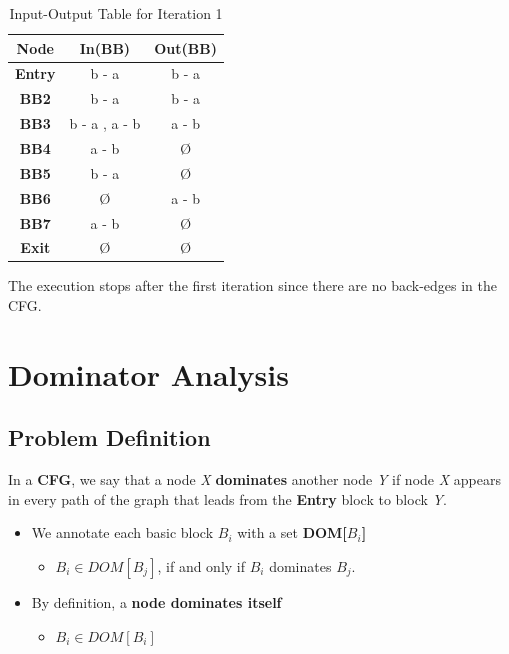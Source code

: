 \documentclass[a4paper,12pt,numbers=noenddot]{scrreprt}
\begin{document}
        \begin{table}[H]
            \centering
            \begin{tabular}{|c|c|c|}
                \hline
                \textbf{Node} & \textbf{In(BB)} & \textbf{Out(BB)} \\
                \hline
                \textbf{Entry} & b - a & b - a \\
                \textbf{BB2}   & b - a & b - a \\
                \textbf{BB3}   & b - a , a - b  & a - b \\
                \textbf{BB4}   & a - b & Ø \\
                \textbf{BB5}   & b - a & Ø \\
                \textbf{BB6}   & Ø & a - b\\
                \textbf{BB7}   & a - b & Ø \\
                \textbf{Exit}  & Ø & Ø \\
                \hline
            \end{tabular}
            \caption{Input-Output Table for Iteration 1}
            \label{tab:vbe_input_output_table}
        \end{table}

        The execution stops after the first iteration since there are no back-edges in the CFG.

            

\chapter*{Dominator Analysis}

    \section*{Problem Definition}

        In a \textbf{CFG}, we say that a node \textit{X} \textbf{dominates} another node \textit{Y} if node \textit{X} appears in every path of the graph that leads from the \textbf{Entry} block to block \textit{Y}.
        \begin{itemize}
            \item We annotate each basic block $B_i$ with a set \textbf{DOM[$B_i$]}
            \begin{itemize}
                \item $B_i \in DOM[B_j]$, if and only if $B_i$ dominates $B_j$.
            \end{itemize}
            \item By definition, a \textbf{node dominates itself}
                \begin{itemize}
                    \item $B_i \in DOM[B_i]$
                \end{itemize}
        \end{itemize}
\end{document}
